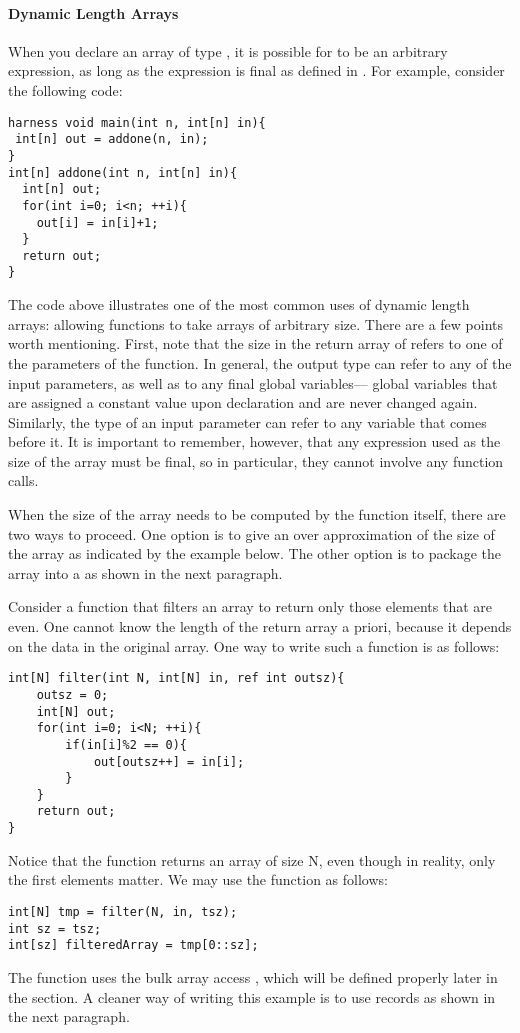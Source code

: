 \paragraph{Dynamic Length Arrays}

When you declare an array of type , it is possible for  to be an arbitrary expression, as long as the expression is final as defined in . For example, consider the following code:
\begin{lstlisting}
harness void main(int n, int[n] in){
 int[n] out = addone(n, in);
}
int[n] addone(int n, int[n] in){
  int[n] out;
  for(int i=0; i<n; ++i){
    out[i] = in[i]+1;
  }
  return out;
}
\end{lstlisting}

The code above illustrates one of the most common uses of dynamic length arrays: allowing functions to take arrays of arbitrary size. There are a few points worth mentioning. First, note that the size in the return array of  refers to one of the parameters of the function. In general, the output type can refer to any of the input parameters, as well as to any final global variables---\ie{} global variables that are assigned a constant value upon declaration and are never changed again. Similarly, the type of an input parameter can refer to any variable that comes before it. It is important to remember, however, that any expression used as the size of the array must be final, so in particular, they cannot involve any function calls.

When the size of the array needs to be computed by the function itself, there are two ways to proceed. One option is to give an over approximation of the size of the array as indicated by the example below. The other option is to package the array into a  as shown in the next paragraph.

\begin{Example}
Consider a function that filters an array to return only those elements that are even. One cannot know the length of the return array a priori, because it depends on the data in the original array. One way to write such a function is as follows:
\begin{lstlisting}
int[N] filter(int N, int[N] in, ref int outsz){
	outsz = 0;
	int[N] out;
	for(int i=0; i<N; ++i){ 
		if(in[i]%2 == 0){
			out[outsz++] = in[i];			
		}
	}
	return out;
}
\end{lstlisting}
Notice that the function returns an array of size N, even though in reality, only the first  elements matter. We may use the function as follows:
\begin{lstlisting}
int[N] tmp = filter(N, in, tsz);
int sz = tsz;
int[sz] filteredArray = tmp[0::sz];
\end{lstlisting}
The function uses the bulk array access , which will be defined properly later in the section. A cleaner way of writing this example is to use records as shown in the next paragraph.
\end{Example}

